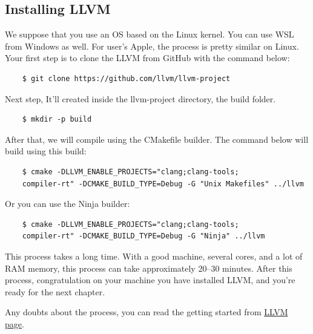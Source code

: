 \subsection{Installing LLVM}

We suppose that you use an OS based on the Linux kernel. You can use WSL from Windows as well. For user's Apple, the process is pretty similar on Linux.
Your first step is to clone the LLVM from GitHub with the command below:

\begin{verbatim}
    $ git clone https://github.com/llvm/llvm-project
\end{verbatim}

Next step, It'll created inside the llvm-project directory, the build folder. 

\begin{verbatim}
    $ mkdir -p build
\end{verbatim}

After that, we will compile using the CMakefile builder. The command below will build using this build:

\begin{verbatim}
    $ cmake -DLLVM_ENABLE_PROJECTS="clang;clang-tools;
    compiler-rt" -DCMAKE_BUILD_TYPE=Debug -G "Unix Makefiles" ../llvm
\end{verbatim}

Or you can use the Ninja builder:

\begin{verbatim}
    $ cmake -DLLVM_ENABLE_PROJECTS="clang;clang-tools;
    compiler-rt" -DCMAKE_BUILD_TYPE=Debug -G "Ninja" ../llvm
\end{verbatim}

This process takes a long time. With a good machine, several cores, and a lot of RAM memory, this process can take approximately 20–30 minutes. After this process, congratulation on your machine you have installed LLVM, and you're ready for the next chapter. 

Any doubts about the process, you can read the getting started from \hyperlink{https://llvm.org/docs/GettingStarted.html}{LLVM page}.